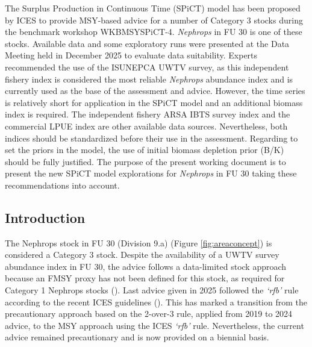 \documentclass[
  12pt,
]{article}
\begin{document}
The Surplus Production in Continuous Time (SPiCT) model has been proposed by ICES to provide MSY-based advice for a number of Category 3 stocks during the benchmark workshop WKBMSYSPiCT-4. \emph{Nephrops} in FU 30 is one of these stocks. Available data and some exploratory runs were presented at the Data Meeting held in December 2025 to evaluate data suitability. Experts recommended the use of the ISUNEPCA UWTV survey, as this independent fishery index is considered the most reliable \emph{Nephrops} abundance index and is currently used as the base of the assessment and advice. However, the time series is relatively short for application in the SPiCT model and an additional biomass index is required. The independent fishery ARSA IBTS survey index and the commercial LPUE index are other available data sources. Nevertheless, both indices should be standardized before their use in the assessment. Regarding to set the priors in the model, the use of initial biomass depletion prior (B/K) should be fully justified. The purpose of the present working document is to present the new SPiCT model explorations for \emph{Nephrops} in FU 30 taking these recommendations into account.

\newpage

\subsection{Introduction}\label{introduction}

The Nephrops stock in FU 30 (Division 9.a) (Figure \ref{fig:areaconcept}) is considered a Category 3 stock. Despite the availability of a UWTV survey abundance index in FU 30, the advice follows a data-limited stock approach because an FMSY proxy has not been defined for this stock, as required for Category 1 Nephrops stocks (). Last advice given in 2025 followed the \emph{`rfb'} rule according to the recent ICES guidelines (). This has marked a transition from the precautionary approach based on the 2-over-3 rule, applied from 2019 to 2024 advice, to the MSY approach using the ICES \emph{`rfb'} rule. Nevertheless, the current advice remained precautionary and is now provided on a biennial basis.
\end{document}
